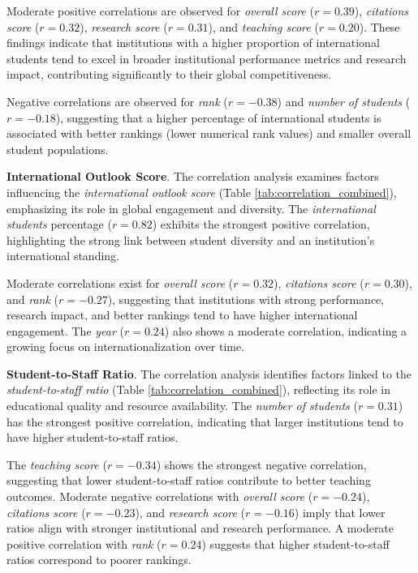 \documentclass[conference]{IEEEtran}
\begin{document}
Moderate positive correlations are observed for \textit{overall score} ($r = 0.39$), \textit{citations score} ($r = 0.32$), \textit{research score} ($r = 0.31$), and \textit{teaching score} ($r = 0.20$). These findings indicate that institutions with a higher proportion of international students tend to excel in broader institutional performance metrics and research impact, contributing significantly to their global competitiveness.

Negative correlations are observed for \textit{rank} ($r = -0.38$) and \textit{number of students} ($r = -0.18$), suggesting that a higher percentage of international students is associated with better rankings (lower numerical rank values) and smaller overall student populations. 


\textbf{International Outlook Score}. The correlation analysis examines factors influencing the \textit{international outlook score} (Table \ref{tab:correlation_combined}), emphasizing its role in global engagement and diversity. The \textit{international students} percentage ($r = 0.82$) exhibits the strongest positive correlation, highlighting the strong link between student diversity and an institution’s international standing.

Moderate correlations exist for \textit{overall score} ($r = 0.32$), \textit{citations score} ($r = 0.30$), and \textit{rank} ($r = -0.27$), suggesting that institutions with strong performance, research impact, and better rankings tend to have higher international engagement. The \textit{year} ($r = 0.24$) also shows a moderate correlation, indicating a growing focus on internationalization over time.

\textbf{Student-to-Staff Ratio}. The correlation analysis identifies factors linked to the \textit{student-to-staff ratio} (Table \ref{tab:correlation_combined}), reflecting its role in educational quality and resource availability. The \textit{number of students} ($r = 0.31$) has the strongest positive correlation, indicating that larger institutions tend to have higher student-to-staff ratios.

The \textit{teaching score} ($r = -0.34$) shows the strongest negative correlation, suggesting that lower student-to-staff ratios contribute to better teaching outcomes. Moderate negative correlations with \textit{overall score} ($r = -0.24$), \textit{citations score} ($r = -0.23$), and \textit{research score} ($r = -0.16$) imply that lower ratios align with stronger institutional and research performance. A moderate positive correlation with \textit{rank} ($r = 0.24$) suggests that higher student-to-staff ratios correspond to poorer rankings.
\end{document}
